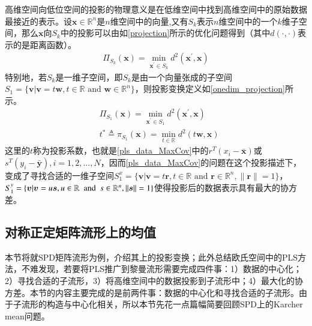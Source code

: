 高维空间向低位空间的投影的物理意义是在低维空间中找到高维空间中的原始数据最接近的表示。设$\bm{x} \in \mathbb{R}^{n}$是$n$维空间中的向量,又有$S_k$表示$n$维空间中的一个$k$维子空间，那么$\bm{x}$向$S_k$中的投影可以由如\ref{projection}所示的优化问题得到（其中$d(\cdot,\cdot)$表示的是距离函数）。
\begin{equation}
\label{projection}
\begin{split}
\Pi_{S_k}(\bm{x})=\min_{\bm{x}^{\prime} \in S_k}d^{2}(\bm{x}^{\prime},\bm{x})
\end{split}
\end{equation}
特别地，若$S_k$是一维子空间，即$S_k$是由一个向量张成的子空间$S_1=\{\bm{v}|\bm{v}=t\bm{w},t\in \mathbb{R}\text{ and }\bm{w}\in\mathbb{R}^{n}\}$，则投影变换定义如\ref{onedim_projection}所示。
\begin{equation}
\label{onedim_projection}
\begin{split}
&\Pi_{S_1}(\bm{x})=\min_{\bm{x}^{\prime} \in S_1}d^{2}(\bm{x}^{\prime},\bm{x})\\
&t^{*} \triangleq \pi_{S_1}(\bm{x})=\min_{t\in\mathbb{R}}d^{2}(t\bm{w},\bm{x})
\end{split}
\end{equation}
这里的$t$称为投影系数，也就是\ref{pls_data_MaxCov}中的$r^{T}(x_{i}-\bar{\bm{x}})$或$s^{T}(y_{i}-\bar{\bm{y}}),i=1,2,...,N$，因而\ref{pls_data_MaxCov}的问题在这个投影描述下，变成了寻找合适的一维子空间$S_{1}^{x}=\{\bm{v}|\bm{v}=t\bm{r},t\in \mathbb{R}\text{ and }\bm{r}\in\mathbb{R}^{n},\|\bm{r}\|=1\}$，$S_{1}^{y}=\{\bm{v}|\bm{v}=u\bm{s},u\in \mathbb{R}~~{\rm and}~~s\in\mathbb{R}^{n},\|\bm{s}\|=1\}$使得投影后的数据表示具有最大的协方差。
\subsection{对称正定矩阵流形上的均值}
\label{sec:riemannian_mean}
本节将就SPD矩阵流形为例，介绍其上的投影变换；此外总结欧氏空间中的PLS方法，不难发现，若要将PLS推广到黎曼流形需要完成四件事：1）数据的中心化；2）寻找合适的子流形，3）将高维空间中的数据投影到子流形中；4）最大化的协方差。本节的内容主要完成的是前两件事：数据的中心化和寻找合适的子流形。由于子流形的构造与中心化相关，所以本节先花一点篇幅简要回顾SPD上的Karcher mean问题。

